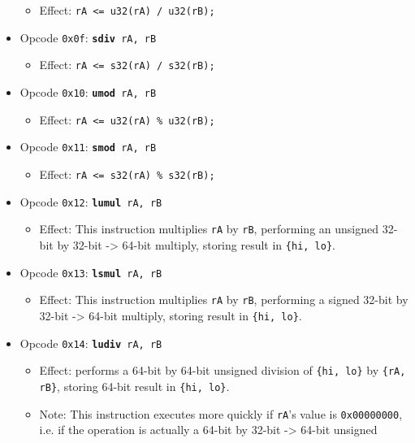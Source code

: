 \documentclass{article}
\begin{document}
\begin{itemize}
\begin{itemize}
		\item Effect: \texttt{rA <= u32(rA) / u32(rB);}
		\end{itemize}
	\item Opcode \texttt{0x0f}:
		\texttt{\textbf{sdiv} rA, rB}
		\begin{itemize}
		\item Effect: \texttt{rA <= s32(rA) / s32(rB);}
		\end{itemize}
	\item Opcode \texttt{0x10}:
		\texttt{\textbf{umod} rA, rB}
		\begin{itemize}
		\item Effect: \texttt{rA <= u32(rA) \% u32(rB);}
		\end{itemize}
	\item Opcode \texttt{0x11}:
		\texttt{\textbf{smod} rA, rB}
		\begin{itemize}
		\item Effect: \texttt{rA <= s32(rA) \% s32(rB);}
		\end{itemize}
	\item Opcode \texttt{0x12}:
		\texttt{\textbf{lumul} rA, rB}
		\begin{itemize}
		\item Effect: This instruction multiplies \texttt{rA} by
		\texttt{rB}, performing an unsigned 32-bit by 32-bit -> 64-bit
		multiply, storing result in \texttt{\{hi, lo\}}.
		\end{itemize}
	\item Opcode \texttt{0x13}:
		\texttt{\textbf{lsmul} rA, rB}
		\begin{itemize}
		\item Effect: This instruction multiplies \texttt{rA} by
		\texttt{rB}, performing a signed 32-bit by 32-bit -> 64-bit
		multiply, storing result in \texttt{\{hi, lo\}}.
		\end{itemize}
	\item Opcode \texttt{0x14}:
		\texttt{\textbf{ludiv} rA, rB}
		\begin{itemize}
		\item Effect: performs a 64-bit by 64-bit unsigned division of
		\texttt{\{hi, lo\}} by \texttt{\{rA, rB\}}, storing 64-bit
		result in \texttt{\{hi, lo\}}.
		\item Note: This instruction executes more quickly if
		\texttt{rA}'s value is \texttt{0x00000000}, i.e. if the
		operation is actually a 64-bit by 32-bit -> 64-bit unsigned

\end{itemize}
\end{itemize}
\end{document}
